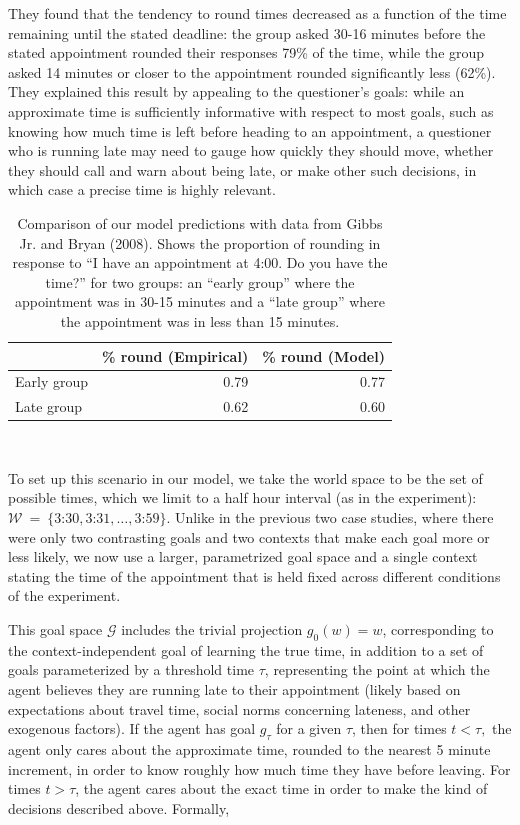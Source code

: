 \documentclass[12pt, floatsintext, jou]{apa6}
\begin{document}
They found that the tendency to round times decreased as a function of the time remaining until the stated deadline: the group asked 30-16 minutes before the stated appointment rounded their responses 79\% of the time, while the group asked 14 minutes or closer to the appointment rounded significantly less (62\%). They explained this result by appealing to the questioner's goals: while an approximate time is sufficiently informative with respect to most goals, such as knowing how much time is left before heading to an appointment, a questioner who is running late may need to gauge how quickly they should move, whether they should call and warn about being late, or make other such decisions, in which case a precise time is highly relevant. 
\begin{table}[t]
\centering
\begin{tabular}{ p{2cm} | r |||||| r }
&  \% round (Empirical) &  \% round (Model) \\
\hline
Early group &  0.79 & 0.77 \\
\hline
Late group     &0.62  & 0.60 \\
\end{tabular}
\\[1.5pt]
\caption{Comparison of our model predictions with data from Gibbs Jr. and Bryan (2008). Shows the proportion of rounding in response to ``I have an appointment at 4:00. Do you have the time?'' for two groups: an ``early group'' where the appointment was in 30-15 minutes and a ``late group'' where the appointment was in less than 15 minutes.} 
\label{table:gibbsJrExp3}
\end{table}

To set up this scenario in our model, we take the world space to be the set of possible times, which we limit to a half hour interval (as in the experiment): $\mathcal{W}~=~\{\textrm{3:30}, \textrm{3:31}, \dots, \textrm{3:59}\}$. Unlike in the previous two case studies, where there were only two contrasting goals and two contexts that make each goal more or less likely, we now use a larger, parametrized goal space and a single context stating the time of the appointment that is held fixed across different conditions of the experiment. 

This goal space $\mathcal{G}$ includes the trivial projection $g_0(w) = w$, corresponding to the context-independent goal of learning the true time, in addition to a set of goals parameterized by a threshold time $\tau$, representing the point at which the agent believes they are running late to their appointment (likely based on expectations about travel time, social norms concerning lateness, and other exogenous factors). If the agent has goal $g_\tau$ for a given $\tau$, then for times $t < \tau,$ the agent only cares about the approximate time, rounded to the nearest 5 minute increment, in order to know roughly how much time they have before leaving. For times $t > \tau$, the agent cares about the exact time in order to make the kind of decisions described above. Formally,
\end{document}
